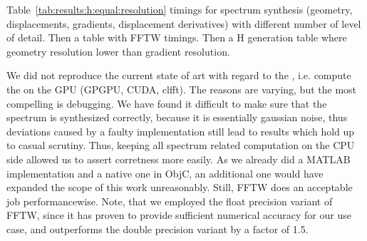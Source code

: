 %
%
Table~\ref{tab:results:h:equal:resolution} timings for spectrum synthesis
(geometry, displacements, gradients, displacement derivatives) with
different number of level of detail. Then a table with FFTW timings.
Then a H generation table where geometry resolution lower than gradient resolution.
% 




We did not reproduce the current state of art with regard to the \FourierTransform,
i.e. compute the \IDFT on the GPU (GPGPU, CUDA, clfft). The reasons are varying,
but the most compelling is debugging. We have found it difficult to make sure
that the spectrum is synthesized correctly, because it is essentially gaussian noise,
thus deviations caused by a faulty implementation still lead to results which hold
up to casual scrutiny. Thus, keeping all spectrum related computation on the
CPU side allowed us to assert corretness more easily.
As we already did a MATLAB implementation and a native one
in ObjC, an additional one would have expanded the scope of this work unreasonably.
Still, FFTW does an acceptable job performancewise. Note, that we employed the
float precision variant of FFTW, since it has proven to provide sufficient
numerical accuracy for our use case, and outperforms the double precision variant
by a factor of 1.5.

